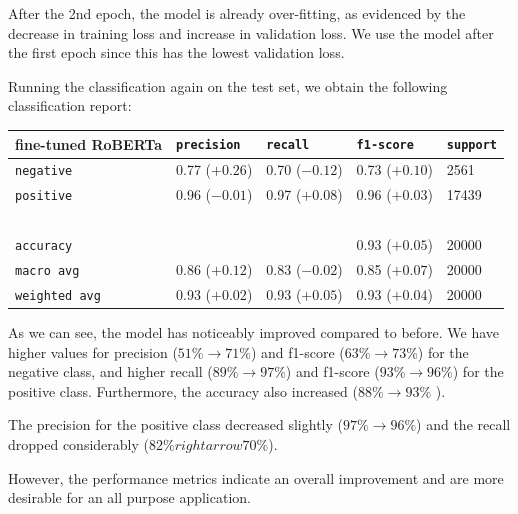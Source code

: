 \documentclass[a4paper,10pt, openright]{article}
\begin{document}
After the 2nd epoch, the model is already over-fitting, as evidenced by the decrease in training loss and increase in validation loss. We use the model after the first epoch since this has the lowest validation loss. 

Running the classification again on the test set, we obtain the following classification report:

\begin{table}[!ht]
	\centering
	\begin{tabular}{|l|l|l|l|l|}
		\hline
		fine-tuned RoBERTa & \texttt{precision} & \texttt{recall} & \texttt{f1-score} & \texttt{support} \\ \hline
		\texttt{negative} & 0.77 \scriptsize ($\mathbf{+0.26}$) & 0.70 \scriptsize ($ \mathbf{-0.12}$) & 0.73 \scriptsize ($ \mathbf{+0.10}$) & 2561 \\ 
		\texttt{positive} & 0.96 \scriptsize ($ \mathbf{-0.01}$) & 0.97 \scriptsize ($ \mathbf{+0.08}$) & 0.96 \scriptsize ($ \mathbf{+0.03}$) & 17439 \\
		~ & ~ & ~ & ~ & ~ \\
		\texttt{accuracy} & ~ & ~ & 0.93 \scriptsize ($\mathbf{+0.05}$) & 20000 \\ 
		\texttt{macro avg} & 0.86    \scriptsize ($ \mathbf{+0.12}$) & 0.83 \scriptsize ($ \mathbf{-0.02}$) & 0.85 \scriptsize ($ \mathbf{+0.07}$) & 20000 \\ 
		\texttt{weighted avg} & 0.93 \scriptsize ($ \mathbf{+0.02}$) & 0.93 \scriptsize ($ \mathbf{+0.05}$) & 0.93 \scriptsize ($ \mathbf{+0.04}$) & 20000 \\ \hline
	\end{tabular}
\end{table}





As we can see, the model has noticeably improved compared to before. We have higher values for precision ($51\% \rightarrow 71\%$) and f1-score ($63\% \rightarrow 73\%$) for the negative class, and higher recall ($89\% \rightarrow 97\%$) and f1-score ($93\% \rightarrow 96\%$) for the positive class. Furthermore, the accuracy also increased ($88\% \rightarrow 93\%$ ). 

The precision for the positive class decreased slightly ($97\% \rightarrow 96\%$) and the recall dropped considerably ($82\% rightarrow 70\%$).

However, the performance metrics indicate an overall improvement and are more desirable for an all purpose application. 
\end{document}

